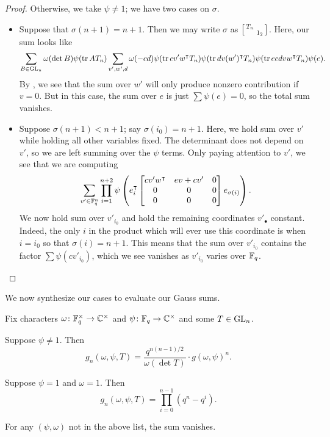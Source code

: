 \begin{proof}
    Otherwise, we take $\psi\ne1$; we have two cases on $\sigma$.
    \begin{itemize}
        \item Suppose that $\sigma(n+1)=n+1$. Then we may write $\sigma$ as $\begin{bsmallmatrix}
            T_n \\ & 1_2
        \end{bsmallmatrix}$. Here, our sum looks like
        \[\sum_{B\in\mathrm{GL}_n}\omega(\det B)\psi(\operatorname{tr} AT_n)\sum_{v',w',d}\omega(-cd)\psi(\operatorname{tr} cv'w^\intercal T_n)\psi(\operatorname{tr} dv(w')^\intercal T_n)\psi(\operatorname{tr} ecdvw^\intercal T_n)\psi(e).\]
        By , we see that the sum over $w'$ will only produce nonzero contribution if $v=0$. But in this case, the sum over $e$ is just $\sum\psi(e)=0$, so the total sum vanishes.
        \item Suppose $\sigma(n+1)<n+1$; say $\sigma(i_0)=n+1$. Here, we hold sum over $v'$ while holding all other variables fixed. The determinant does not depend on $v'$, so we are left summing over the $\psi$ terms. Only paying attention to $v'$, we see that we are computing
        \[\sum_{v'\in\mathbb F_q^n}\prod_{i=1}^{n+2}\psi\left(e_i^\intercal \begin{bmatrix}
            cv'w^\intercal & ev+cv' & 0 \\
            0 & 0 & 0 \\
            0 & 0 & 0
        \end{bmatrix}e_{\sigma(i)}\right).\]
        We now hold sum over $v'_{i_0}$ and hold the remaining coordinates $v'_\bullet$ constant. Indeed, the only $i$ in the product which will ever use this coordinate is when $i=i_0$ so that $\sigma(i)=n+1$. This means that the sum over $v'_{i_0}$ contains the factor $\sum\psi(cv'_{i_0})$, which we see vanishes as $v'_{i_0}$ varies over $\mathbb F_q$.
        \qedhere
    \end{itemize}
\end{proof}
We now synthesize our cases to evaluate our Gauss sums.
\begin{theorem} \label{thm:gsum-gl}
    Fix characters $\omega\colon\mathbb F_q^\times\to\mathbb C^\times$ and $\psi\colon\mathbb F_q\to\mathbb C^\times$ and some $T\in\mathrm{GL}_n$.
    \begin{listalph}
        \item Suppose $\psi\ne1$. Then
        \[g_n(\omega,\psi,T)=\frac{q^{n(n-1)/2}}{\omega(\det T)}\cdot g(\omega,\psi)^n.\]
        \item Suppose $\psi=1$ and $\omega=1$. Then
        \[g_n(\omega,\psi,T)=\prod_{i=0}^{n-1}\left(q^n-q^i\right).\]
    \end{listalph}For any $(\psi,\omega)$ not in the above list, the sum vanishes.
\end{theorem}
